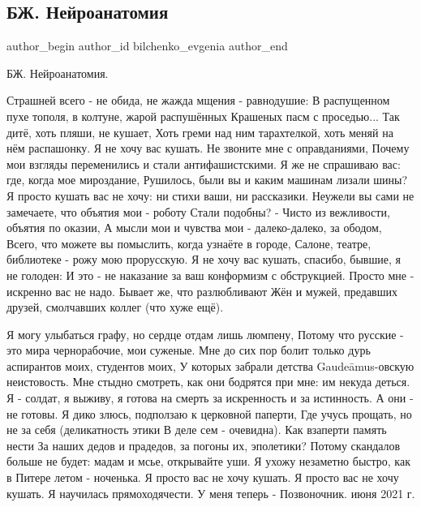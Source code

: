  
 
 
 
 
 
\subsection{БЖ. Нейроанатомия}
\label{sec:25_06_2021.fb.bilchenko_evgenia.1.nejroanatomia}
\ifcmt
 author_begin
   author_id bilchenko_evgenia
 author_end
\fi

БЖ. Нейроанатомия.

\begin{multicols}{2}
\obeycr
Страшней всего - не обида, не жажда мщения - равнодушие:
В распущенном пухе тополя, в колтуне, жарой распушённых
Крашеных пасм с проседью... Так дитё, хоть пляши, не кушает,
Хоть греми над ним тарахтелкой, хоть меняй на нём распашонку.
\smallskip
Я не хочу вас кушать. Не звоните мне с оправданиями,
Почему мои взгляды переменились и стали антифашистскими.
Я же не спрашиваю вас: где, когда мое мироздание, 
Рушилось, были вы и каким машинам лизали шины?
Я просто кушать вас не хочу: ни стихи ваши, ни рассказики.
\smallskip
Неужели вы сами не замечаете, что объятия мои - роботу
Стали подобны? - Чисто из вежливости, объятия по оказии,
А мысли мои и чувства мои - далеко-далеко, за ободом,
Всего, что можете вы помыслить, когда узнаёте в городе,
Салоне, театре, библиотеке - рожу мою прорусскую.
\smallskip
Я не хочу вас кушать, спасибо, бывшие, я не голоден:
И это - не наказание за ваш конформизм с обструкцией.
Просто мне - искренно вас не надо. Бывает же, что разлюбливают
Жён и мужей, предавших друзей, смолчавших коллег (что хуже ещё).
\restorecr
\end{multicols}
\begin{multicols}{2}
\obeycr
Я могу улыбаться графу, но сердце отдам лишь люмпену,
Потому что русские - это мира чернорабочие, мои суженые.
Мне до сих пор болит только дурь аспирантов моих, студентов моих,
У которых забрали детства Gaudeāmus-овскую неистовость.
Мне стыдно смотреть, как они бодрятся при мне: им некуда деться.
\smallskip
Я - солдат, я выживу, я готова на смерть за искренность и за истинность.
А они - не готовы. Я дико злюсь,  подползаю к церковной паперти,
Где учусь прощать, но не за себя (деликатность этики
В деле сем - очевидна). Как взаперти память нести
За наших дедов и прадедов, за погоны их, эполетики?
\smallskip
Потому скандалов больше не будет: мадам и мсье, открывайте уши.
Я ухожу незаметно быстро, как в Питере летом - ноченька.
Я просто вас не хочу кушать. Я просто вас не хочу кушать.
Я научилась прямоходячести. У меня теперь -
Позвоночник.
 июня 2021 г.
\restorecr
\end{multicols}

